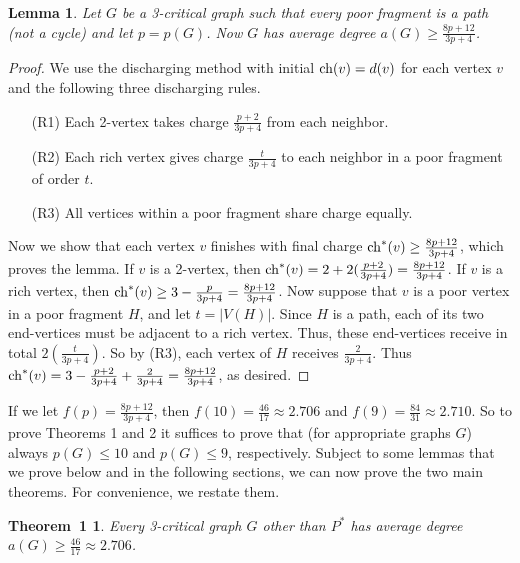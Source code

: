 \documentclass[12pt]{article}
\theoremstyle{plain}
\newtheorem*{mainthm1}{Theorem~1}
\newtheorem{lem}[prop]{Lemma}
\theoremstyle{definition}
\theoremstyle{remark}
\def\ch{{\rm ch}}
\begin{document}
\begin{lem}
Let $G$ be a 3-critical graph such that every poor fragment is a path (not a
cycle) and let $p=p(G)$.  Now $G$ has average degree $a(G)\ge
\frac{8p+12}{3p+4}$.
\label{keylemma}
\end{lem}
\begin{proof}
We use the discharging method with initial $\ch(v)=d(v)$ for each vertex $v$ and
the following three discharging rules.
\begin{enumerate}
\item[(R1)] Each 2-vertex takes charge $\frac{p+2}{3p+4}$ from each neighbor.
\item[(R2)] Each rich vertex gives charge $\frac{t}{3p+4}$ to each neighbor in a
poor fragment of order $t$.
\item[(R3)] All vertices within a poor fragment share charge equally.
\end{enumerate}

Now we show that each vertex $v$ finishes with final charge $\ch^*(v)\ge 
\frac{8p+12}{3p+4}$, which proves the lemma.  If $v$ is a 2-vertex, then
$\ch^*(v)=2+2(\frac{p+2}{3p+4}) = \frac{8p+12}{3p+4}$.  If $v$ is a rich vertex,
then $\ch^*(v)\ge 3-\frac{p}{3p+4} = \frac{8p+12}{3p+4}$.  Now suppose that $v$
is a poor vertex in a poor fragment $H$, and let $t=|V(H)|$.  Since $H$ is a
path, each of its two end-vertices must be adjacent to a rich vertex.  Thus,
these end-vertices receive in total $2(\frac{t}{3p+4})$.  So by (R3), each vertex
of $H$ receives $\frac2{3p+4}$.  Thus $\ch^*(v) = 3 - \frac{p+2}{3p+4}
+\frac2{3p+4} = \frac{8p+12}{3p+4}$, as desired.
\end{proof}

If we let $f(p)=\frac{8p+12}{3p+4}$, then $f(10)=\frac{46}{17}\approx 2.706$ and
$f(9)=\frac{84}{31}\approx 2.710$.  So to prove Theorems 1 and 2 it suffices to
prove that (for appropriate graphs $G$) always $p(G)\le 10$ and $p(G)\le 9$,
respectively.  Subject to some lemmas that we prove below and in the following
sections, we can now prove the two main theorems. For convenience, we restate them.

\begin{mainthm1}
Every 3-critical graph $G$ other than $P^*$ has average
degree $a(G)\ge \frac{46}{17}\approx 2.706$.
\end{mainthm1}
\end{document}
